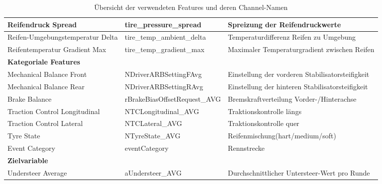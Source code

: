 \begin{table}[H]
\begin{tabular}{|p{4.5cm}|p{3.5cm}|p{6cm}|}
    \hline
    Reifendruck Spread & tire\_pressure\_spread & Spreizung der Reifendruckwerte \\
    \hline
    Reifen-Umgebungstemperatur Delta & tire\_temp\_ambient\_delta & Temperaturdifferenz Reifen zu Umgebung \\
    \hline
    Reifentemperatur Gradient Max & tire\_temp\_gradient\_max & Maximaler Temperaturgradient zwischen Reifen \\
    \hline
    \multicolumn{3}{|l|}{\textbf{Kategoriale Features}} \\
    \hline
    Mechanical Balance Front & NDriverARBSettingFAvg & Einstellung der vorderen Stabilisatorsteifigkeit \\
    \hline
    Mechanical Balance Rear & NDriverARBSettingRAvg & Einstellung der hinteren Stabilisatorsteifigkeit \\
    \hline
    Brake Balance & rBrakeBiasOffsetRequest\_AVG & Bremskraftverteilung Vorder-/Hinterachse \\
    \hline
    Traction Control Longitudinal & NTCLongitudinal\_AVG & Traktionskontrolle längs \\
    \hline
    Traction Control Lateral & NTCLateral\_AVG & Traktionskontrolle quer \\
    \hline
    Tyre State & NTyreState\_AVG & Reifenmischung(hart/medium/soft) \\
    \hline
    Event Category & eventCategory & Rennstrecke \\
    \hline
    \multicolumn{3}{|l|}{\textbf{Zielvariable}} \\
    \hline
    Understeer Average & aUndersteer\_AVG & Durchschnittlicher Untersteer-Wert pro Runde \\
    \hline
  \end{tabular}
  \caption{Übersicht der verwendeten Features und deren Channel-Namen}
  \label{tab:features_channels}
\end{table}